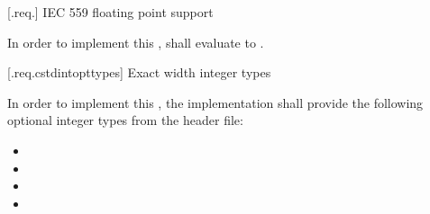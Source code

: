  [\iotwod.req.\iecfivefivenine] {IEC 559 floating point support}

\pnum
In order to implement this \documenttypename{},  shall evaluate to . 

 [\iotwod.req.cstdintopttypes] {Exact width integer types}

\pnum
In order to implement this \documenttypename{}, the implementation shall provide the following optional integer types from the  header file:
\begin{itemize}
	\item {}
	\item {}
	\item {}
	\item {}
\end{itemize}
